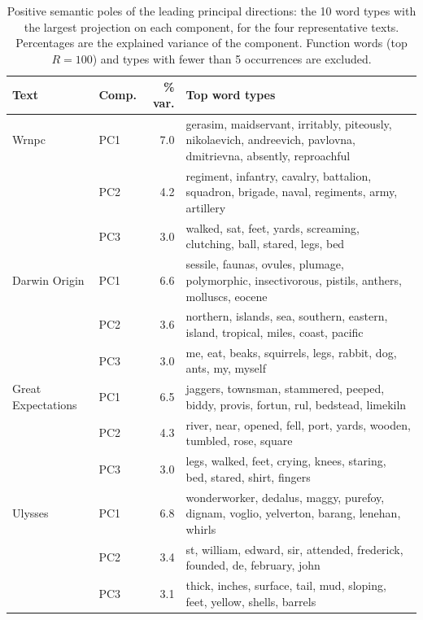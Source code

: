 \begin{table}[htbp]
\centering
\small
\caption{Positive semantic poles of the leading principal directions: the 10 word types with the largest projection on each component, for the four representative texts. Percentages are the explained variance of the component. Function words (top $R=100$) and types with fewer than 5 occurrences are excluded.}
\label{tab:poles}
\begin{tabular}{llrp{}}
\toprule
Text & Comp. & \% var. & Top word types \\
\midrule
Wrnpc & PC1 & 7.0 & gerasim, maidservant, irritably, piteously, nikolaevich, andreevich, pavlovna, dmitrievna, absently, reproachful \\
 & PC2 & 4.2 & regiment, infantry, cavalry, battalion, squadron, brigade, naval, regiments, army, artillery \\
 & PC3 & 3.0 & walked, sat, feet, yards, screaming, clutching, ball, stared, legs, bed \\
\midrule
Darwin Origin & PC1 & 6.6 & sessile, faunas, ovules, plumage, polymorphic, insectivorous, pistils, anthers, molluscs, eocene \\
 & PC2 & 3.6 & northern, islands, sea, southern, eastern, island, tropical, miles, coast, pacific \\
 & PC3 & 3.0 & me, eat, beaks, squirrels, legs, rabbit, dog, ants, my, myself \\
\midrule
Great Expectations & PC1 & 6.5 & jaggers, townsman, stammered, peeped, biddy, provis, fortun, rul, bedstead, limekiln \\
 & PC2 & 4.3 & river, near, opened, fell, port, yards, wooden, tumbled, rose, square \\
 & PC3 & 3.0 & legs, walked, feet, crying, knees, staring, bed, stared, shirt, fingers \\
\midrule
Ulysses & PC1 & 6.8 & wonderworker, dedalus, maggy, purefoy, dignam, voglio, yelverton, barang, lenehan, whirls \\
 & PC2 & 3.4 & st, william, edward, sir, attended, frederick, founded, de, february, john \\
 & PC3 & 3.1 & thick, inches, surface, tail, mud, sloping, feet, yellow, shells, barrels \\
\bottomrule
\end{tabular}
\end{table}
